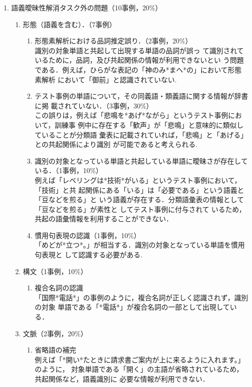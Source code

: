 \documentclass[japanese]{jnlp_1.4}
\begin{document}
\begin{enumerate}
\item 語義曖昧性解消タスク外の問題（10事例，20\%）

\begin{enumerate}
\item 形態（語義を含む）．（7事例）

\begin{enumerate}
\item 形態素解析における品詞推定誤り．（2事例，20\%）\\
識別の対象単語と共起して出現する単語の品詞が誤っ
て識別されているために，品詞，及び共起関係の情報が利用できないとい
う問題である．例えば，ひらがな表記の「神のみ*まへ*の」において形態素解析
      において「御前」と認識されていない.
\item テスト事例の単語について，その同義語・類義語に関する情報が辞書に掲
      載されていない．（3事例，30\%）\\
この誤りは，例えば「悲鳴を*あげ*ながら」というテスト事例において，訓練事
      例中に存在する「歓声」が「悲鳴」と意味的に類似していることが分類語
      彙表に記載されていれば，「悲鳴」と「あげる」との共起関係により識別
      が可能であると考えられる.
\item 識別の対象となっている単語と共起している単語に曖昧さが存在して
      いる．（1事例，10\%）\\
例えば「レベリングは*技術*がいる」というテスト事例において，「技術」と共
      起関係にある「いる」は「必要である」という語義と「豆などを煎る」と
      いう語義が存在する．分類語彙表の情報として「豆などを煎る」が素性と
      してテスト事例に付与されて
      いるため，共起の語彙情報を利用することができない．
\item 慣用句表現の認識（1事例，10\%）\\
「めどが*立つ*。」が相当する．識別の対象となっている単語を慣用句表現と
      して認識する必要がある.
\end{enumerate}

\item 構文（1事例，10\%）

\begin{enumerate}
\item 複合名詞の認識\\
「国際*電話*」の事例のように，複合名詞が正しく認識されず，識別の対象
      単語である「*電話*」が複合名詞の一部として出現している．
\end{enumerate}

\item 文脈（2事例，20\%）

\begin{enumerate}
\item 省略語の補完\\
例えば「*開い*たときに請求書ご案内が上に来るように入れます。」のように，
      対象単語である「開く」の主語が省略されているため，共起関係など，語義識別に
      必要な情報が利用できない．
\end{enumerate}
\end{enumerate}
\end{enumerate}
\end{document}
